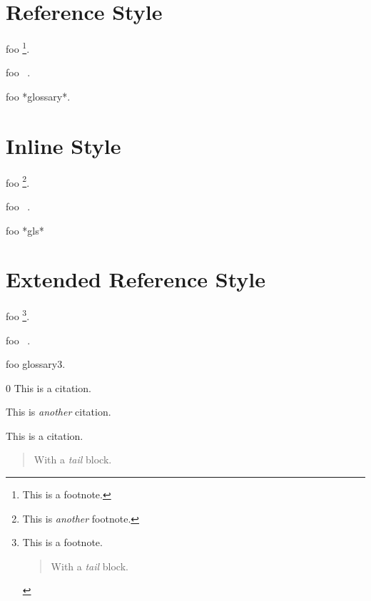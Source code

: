 
\def\mytitle{Endnotes}


\part{Reference Style}
\label{referencestyle}

foo \footnote{This is a footnote.}.

foo ~\citep{cite}.

foo \gls{*glossary*}.

\part{Inline Style}
\label{inlinestyle}

foo \footnote{This is \emph{another} footnote.}.

foo ~\citep{thisisanothercitation.}.

foo \gls{*gls*}

\part{Extended Reference Style}
\label{extendedreferencestyle}

foo \footnote{This is a footnote.

\begin{quote}
With a \emph{tail} block.
\end{quote}}.

foo ~\citep{cite3}.

foo \gls{glossary3}.

\begin{thebibliography}{0}
This is a citation.

This is \emph{another} citation.

This is a citation.

\begin{quote}
With a \emph{tail} block.
\end{quote}

\end{thebibliography}


